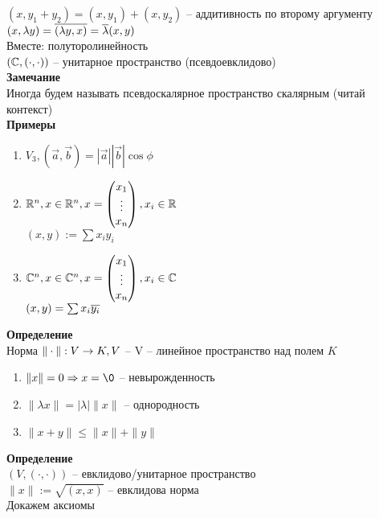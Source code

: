 \documentclass[12pt]{article}
\begin{document}
$(x, y_1 + y_2) = (x, y_1) + (x, y_2)$ -- аддитивность по второму аргументу\\
$(x, \lambda y) = \overline{(\lambda y,x)} = \overline\lambda (x, y)$\\
Вместе: полуторолинейность\\
$(\mathbb{C}, (\cdot, \cdot))$ -- унитарное пространство (псевдоевклидово)\\
\textbf{Замечание}\\
Иногда будем называть псевдоскалярное пространство скалярным (читай контекст)\\
\textbf{Примеры}
\begin{enumerate}
    \item $V_3, (\vec a, \vec b) = |\vec a||\vec b|\cos \phi$
    \item $\mathbb{R}^n, x \in \mathbb{R}^n, x = \begin{pmatrix}
        x_1\\\vdots\\x_n
    \end{pmatrix}, x_i \in \mathbb{R}$\\
    $(x,y) := \sum x_iy_i$
    \item $\mathbb{C}^n, x \in \mathbb{C}^n, x = \begin{pmatrix}
        x_1\\\vdots\\x_n
    \end{pmatrix}, x_i \in \mathbb{C}$\\
    $(x,y) = \sum x_i\overline{y_i}$
\end{enumerate}
\textbf{Определение}\\
Норма $\|\cdot\|: V\rightarrow K, V$ -- V -- линейное пространство над полем $K$
\begin{enumerate}
    \item $\|x\| = 0 \Rto x = \0$ -- невырожденность
    \item $\|\lambda x \| = |\lambda| \|x\|$ -- однородность
    \item $\|x+y\| \leq \|x\| + \|y\|$
\end{enumerate}
\textbf{Определение}\\
$(V, (\cdot, \cdot))$ -- евклидово/унитарное пространство\\
$\|x\|:=\sqrt{(x,x)}$ -- евклидова норма\\
Докажем аксиомы
\end{document}
